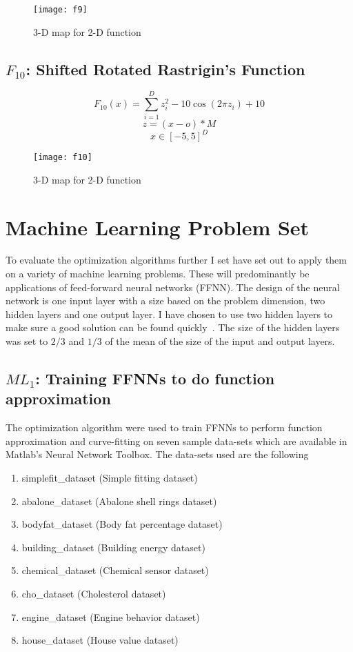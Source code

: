 \begin{figure}[H]
  \centering
  \texttt{[image: f9]}
  \caption{3-D map for 2-D function}
  \label{f9}
\end{figure}

\subsection{$F_{10}$: Shifted Rotated Rastrigin’s Function}

\begin{equation}
  F_{10}(x)=\sum_{i=1}^{D}{z_i^2 - 10\cos{(2\pi z_i)} + 10}
\end{equation}
\[ z=(x-o)*M \]
\[ x \in [-5,5]^D \]

\begin{figure}[H]
  \centering
  \texttt{[image: f10]}
  \caption{3-D map for 2-D function}
  \label{f10}
\end{figure}

\section{Machine Learning Problem Set}

To evaluate the optimization algorithms further I set have set out to apply them on a variety of machine learning problems. These will predominantly be applications of feed-forward neural networks (FFNN). The design of the neural network is one input layer with a size based on the problem dimension, two hidden layers and one output layer. I have chosen to use two hidden layers to make sure a good solution can be found quickly~\cite{329294}. The size of the hidden layers was set to $2/3$ and $1/3$ of the mean of the size of the input and output layers.

\subsection{$ML_{1}$: Training FFNNs to do function approximation}

The optimization algorithm were used to train FFNNs to perform function approximation and curve-fitting on seven sample data-sets which are available in Matlab's Neural Network Toolbox. The data-sets used are the following

\begin{enumerate}
  \item simplefit\_dataset (Simple fitting dataset)
  \item abalone\_dataset (Abalone shell rings dataset)
  \item bodyfat\_dataset (Body fat percentage dataset)
  \item building\_dataset (Building energy dataset)
  \item chemical\_dataset (Chemical sensor dataset)
  \item cho\_dataset (Cholesterol dataset)
  \item engine\_dataset (Engine behavior dataset)
  \item house\_dataset (House value dataset)
\end{enumerate}

